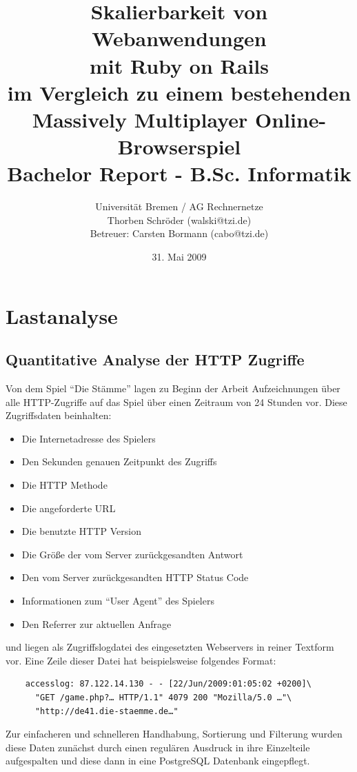 \documentclass[10pt]{scrartcl}
\title{Skalierbarkeit von Webanwendungen\\mit Ruby on Rails\\
\small{im Vergleich zu einem bestehenden\\Massively Multiplayer Online-Browserspiel}\\
\small{Bachelor Report - B.Sc. Informatik}\\
}
\author{Universität Bremen / AG Rechnernetze\\Thorben Schröder (walski@tzi.de)\\Betreuer: Carsten Bormann (cabo@tzi.de)}
\date{31. Mai 2009}
\begin{document}
\maketitle

\tableofcontents
\newpage

  \section{Lastanalyse}
  \label{sec:Lastanalyse}
  
  \subsection{Quantitative Analyse der HTTP Zugriffe}
  Von dem Spiel ``Die Stämme'' lagen zu Beginn der Arbeit Aufzeichnungen über
  alle HTTP-Zugriffe auf das Spiel über einen Zeitraum von 24 Stunden vor.
  Diese Zugriffsdaten beinhalten:
  
  \begin{itemize}
    \item Die Internetadresse des Spielers
    \item Den Sekunden genauen Zeitpunkt des Zugriffs
    \item Die HTTP Methode
    \item Die angeforderte URL
    \item Die benutzte HTTP Version
    \item Die Größe der vom Server zurückgesandten Antwort
    \item Den vom Server zurückgesandten HTTP Status Code
    \item Informationen zum ``User Agent'' des Spielers
    \item Den Referrer zur aktuellen Anfrage
  \end{itemize}
  
  und liegen als Zugriffslogdatei des eingesetzten Webservers in reiner Textform
  vor. Eine Zeile dieser Datei hat beispielsweise folgendes Format:
  
  \begin{verbatim}
    accesslog: 87.122.14.130 - - [22/Jun/2009:01:05:02 +0200]\
      "GET /game.php?… HTTP/1.1" 4079 200 "Mozilla/5.0 …"\
      "http://de41.die-staemme.de…"
  \end{verbatim}
  
  Zur einfacheren und schnelleren Handhabung, Sortierung und Filterung wurden    diese Daten zunächst durch einen regulären Ausdruck in ihre Einzelteile   aufgespalten und diese dann in eine PostgreSQL Datenbank eingepflegt.
  
\end{document}
